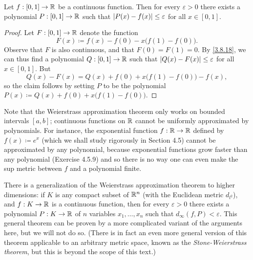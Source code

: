 \begin{cor}\label{3.8.19}
  Let \(f : [0, 1] \to \mathbb{R}\) be a continuous function.
  Then for every \(\varepsilon > 0\) there exists a polynomial \(P : [0, 1] \to \mathbb{R}\) such that \(\left\lvert P(x) - f(x)\right\rvert \leq \varepsilon\) for all \(x \in [0, 1]\).
\end{cor}

\begin{proof}
  Let \(F : [0, 1] \to \mathbb{R}\) denote the function
  \[
    F(x) \coloneqq f(x) - f(0) - x \big(f(1) - f(0)\big).
  \]
  Observe that \(F\) is also continuous, and that \(F(0) = F(1) = 0\).
  By \cref{3.8.18}, we can thus find a polynomial \(Q : [0, 1] \to \mathbb{R}\) such that \(\left\lvert Q(x) - F(x)\right\rvert \leq \varepsilon\) for all \(x \in [0, 1]\).
  But
  \[
    Q(x) - F(x) = Q(x) + f(0) + x \big(f(1) - f(0)\big) - f(x),
  \]
  so the claim follows by setting \(P\) to be the polynomial \(P(x) \coloneqq Q(x) + f(0) + x \big(f(1) - f(0)\big)\).
\end{proof}

\begin{rmk}\label{3.8.20}
  Note that the Weierstrass approximation theorem only works on bounded intervals \([a, b]\);
  continuous functions on \(\mathbb{R}\) cannot be uniformly approximated by polynomials.
  For instance, the exponential function \(f : \mathbb{R} \to \mathbb{R}\) defined by \(f(x) \coloneqq e^x\) (which we shall study rigorously in Section 4.5) cannot be approximated by any polynomial, because exponential functions grow faster than any polynomial (Exercise 4.5.9) and so there is no way one can even make the sup metric between \(f\) and a polynomial finite.
\end{rmk}

\begin{rmk}\label{3.8.21}
  There is a generalization of the Weierstrass approximation theorem to higher dimensions:
  if \(K\) is any compact subset of \(\mathbb{R}^n\) (with the Euclidean metric \(d_{l^2}\)), and \(f : K \to \mathbb{R}\) is a continuous function, then for every \(\varepsilon > 0\) there exists a polynomial \(P : K \to \mathbb{R}\) of \(n\) variables \(x_1, \dots, x_n\) such that \(d_\infty(f, P) < \varepsilon\).
  This general theorem can be proven by a more complicated variant of the arguments here, but we will not do so.
  (There is in fact an even more general version of this theorem applicable to an arbitrary metric space, known as the \emph{Stone-Weierstrass theorem}, but this is beyond the scope of this text.)
\end{rmk}

